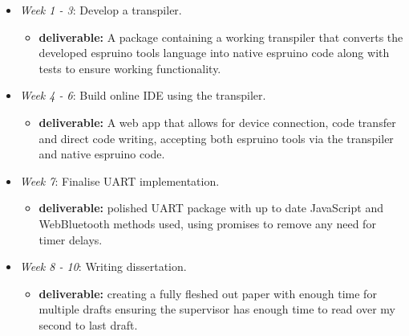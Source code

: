 \documentclass[11pt]{article}
\begin{document}
\begin{itemize}
    \item \textit{Week 1 - 3}: Develop a transpiler.
    \begin{itemize}
        \item \textbf{deliverable:} A package containing a working transpiler that converts the developed espruino tools language into native espruino code along with tests to ensure working functionality.
    \end{itemize}
    \item \textit{Week 4 - 6}: Build online IDE using the transpiler.
    \begin{itemize}
        \item \textbf{deliverable:} A web app that allows for device connection, code transfer and direct code writing, accepting both espruino tools via the transpiler and native espruino code.
    \end{itemize}
        \item \textit{Week 7}: Finalise UART implementation.
    \begin{itemize}
        \item \textbf{deliverable:} polished UART package with up to date JavaScript and WebBluetooth methods used, using promises to remove any need for timer delays.
    \end{itemize}
        \item \textit{Week 8 - 10}: Writing dissertation.
    \begin{itemize}
        \item \textbf{deliverable:} creating a fully fleshed out paper with enough time for multiple drafts ensuring the supervisor has enough time to read over my second to last draft.
    \end{itemize}
\end{itemize}
    
    
    
\end{document}
